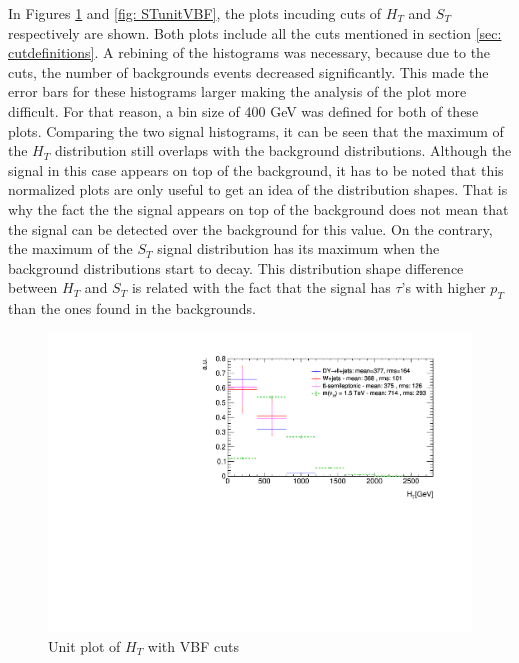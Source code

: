 In Figures \ref{fig: HTunitVBF} and \ref{fig: STunitVBF}, the plots incuding cuts of $H_{T}$ and $S_{T}$ respectively are shown. Both plots include all the cuts mentioned in section \ref{sec: cutdefinitions}. A rebining of the histograms was necessary, because due to the cuts, the number of backgrounds events decreased significantly. This made the error bars for these histograms larger making the analysis of the plot more difficult. For that reason, a bin size of 400 GeV was defined for both of these plots. Comparing the two signal histograms, it can be seen that the maximum of the $H_{T}$ distribution still overlaps with the background distributions. Although the signal in this case appears on top of the background, it has to be noted that this normalized plots are only useful to get an idea of the distribution shapes. That is why the fact the the signal appears on top of the background does not mean that the signal can be detected over the background for this value. On the contrary, the maximum of the $S_{T}$ signal distribution has its maximum when the background distributions start to decay. This distribution shape  difference between $H_{T}$ and $S_{T}$ is related with the fact that the signal has $\tau$'s with higher $p_{T}$ than the ones found in the backgrounds.

\begin{figure}
\begin{center}
 \includegraphics[width=\linewidth]{Plots/HT_unitVBF.pdf}
\end{center}
\caption{Unit plot of $H_{T}$ with VBF cuts}
\label{fig: HTunitVBF}
\end{figure}

